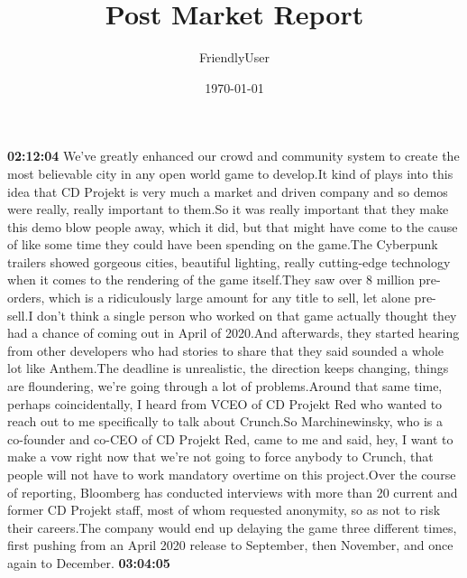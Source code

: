 \documentclass{article}%
\title{Post Market Report}%
\author{FriendlyUser}%
\date{\today}%
\begin{document}
%
\normalsize%
\textbf{02:12:04}%
\newline%
We've greatly enhanced our crowd and community system to create the most believable city in any open world game to develop.It kind of plays into this idea that CD Projekt is very much a market and driven company and so demos were really, really important to them.So it was really important that they make this demo blow people away, which it did, but that might have come to the cause of like some time they could have been spending on the game.The Cyberpunk trailers showed gorgeous cities, beautiful lighting, really cutting{-}edge technology when it comes to the rendering of the game itself.They saw over 8 million pre{-}orders, which is a ridiculously large amount for any title to sell, let alone pre{-}sell.I don't think a single person who worked on that game actually thought they had a chance of coming out in April of 2020.And afterwards, they started hearing from other developers who had stories to share that they said sounded a whole lot like Anthem.The deadline is unrealistic, the direction keeps changing, things are floundering, we're going through a lot of problems.Around that same time, perhaps coincidentally, I heard from VCEO of CD Projekt Red who wanted to reach out to me specifically to talk about Crunch.So Marchinewinsky, who is a co{-}founder and co{-}CEO of CD Projekt Red, came to me and said, hey, I want to make a vow right now that we're not going to force anybody to Crunch, that people will not have to work mandatory overtime on this project.Over the course of reporting, Bloomberg has conducted interviews with more than 20 current and former CD Projekt staff, most of whom requested anonymity, so as not to risk their careers.The company would end up delaying the game three different times, first pushing from an April 2020 release to September, then November, and once again to December.%
\textbf{03:04:05}%
\newline%
\end{document}
